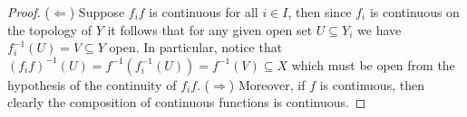 \begin{proof}
(\(\Leftarrow\)) Suppose \(f_i f\) is continuous for all \(i \in I\),
then since \(f_i\) is continuous on the topology of \(Y\) it follows that for
any given open set \(U \subseteq Y_i\) we have \(f_i^{-1}(U) = V \subseteq Y\)
open. In particular, notice that \((f_i f)^{-1}(U) = f^{-1}(f_i^{-1}(U))
= f^{-1}(V) \subseteq X\) which must be open from the hypothesis of the
continuity of \(f_i f\). (\(\Rightarrow\)) Moreover, if \(f\) is
continuous, then clearly the composition of continuous functions is
continuous.
\end{proof}

